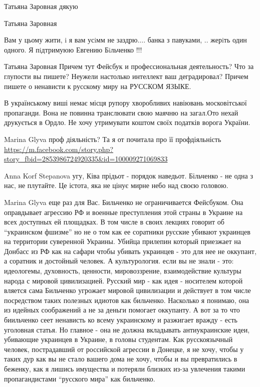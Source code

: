 \begin{itemize}
\begin{itemize}

Татьяна Заровная дякую


Татьяна Заровная

Вам у цьому жити, i я вам усiмм не заздрю.... банка з павуками, ..  жерiть один
одного. Я пiдтримуюю Евгению Бiльченко !!!


Татьяна Заровная Причем тут Фейсбук и профессиональная деятельность? Что за
глупости вы пишете? Неужели настолько интеллект ваш деградировал? Причем пишете
о ненависти к русскому миру на РУССКОМ ЯЗЫКЕ.


В українському виші немає місця рупору хворобливих навіювань московітської
пропаганди. Вона не повинна транслювати свою маячню на загал.Ото нехай
друкується в Ордло. Не хочу утримувати коштом своїх податків ворога України.


Marina Glyva проф діяльність? Та я от почитала про її профдіяльність 
\url{https://m.facebook.com/story.php?story_fbid=2853986724920335&id=100009271069833}


Anna Korf Stepanova угу, Ківа прідьот - порядок наведьот. Більченко - не одна з
нас, не плутайте. Це істота, яка не цінує мирне небо над своєю головою.


Marina Glyva еще раз для Вас. Бильченко не ограничивается Фейсбуком. Она
оправдывает агрессию РФ и военные преступления этой страны в Украине на всех
доступных ей площадках. В том числе в своих лекциях говорит об
\enquote{украинском фшизме} но не о том как ее соратники русские убивают
украинцев на территории суверенной Украины. Убийца прилепин который приезжает
на Донбасс из РФ как на сафари чтобы убивать украинцев - это для нее не
оккупант, а соратник и достойный человек. А культурология. если вы не знали -
это: идеологемы, духовность, ценности, мировоззрение, взаимодействие культуры
народа с мировой цивилизацией. Русский мир - как идея - носителем которой
вляется сама Бильченко угрожает мировой цивилизации и действует в том числе
посредством таких полезных идиотов как бильченко. Насколько я понимаю, она из
идейных соображений а не за деньги помогает оккупанту. А вот за то что
биильченко сеет ненависть ко всему украинскому и разжигает вражду - есть
уголовная статья. Но главное - она не должна вкладывать антиукраинские идеи,
убивающие украинцев в Украине, в головы студентам. Как русскоязычный человек,
пострадавший от российской агрессии в Донецке, я не хочу, чтобы у таких дур как
вы не стало вашего дома не хочу, чтобы и вы превратились в беженку, как я
лишись имущества и потеряли близких из-за увлечения такими пропагандистами
\enquote{русского мира} как бильченко.


\end{itemize}
\end{itemize}

